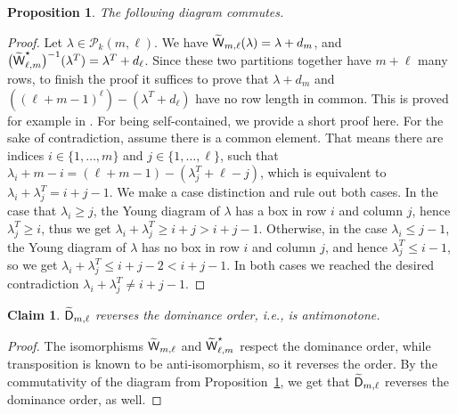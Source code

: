 \documentclass[a4paper]{extarticle}
\newcommand{\la}{\lambda}
\newcommand{\Hodge}{\textsf{\textup{D}}}
\newcommand{\Wronski}{\textsf{\textup{W}}}
\newcommand{\Hermite}{\textsf{\textup{R}}}
\numberwithin{theorem}{section}
\newtheorem{proposition}[theorem]{Proposition}
\newtheorem{claim}[theorem]{Claim}
\theoremstyle{definition}
\begin{document}
\begin{proposition}
\label{pro:transposition}
The following diagram commutes.
\begin{center}
{\centering
{}
}
\end{center}
\end{proposition}


\begin{proof}
Let $\la\in\mathscr P_k(m,\ell)$.
We have $\widetilde{\Wronski}_{m,\ell}(\la) = \la+d_m$,
and $\big(\widetilde{\Wronski}^\star_{\ell,m}\big)^{-1}(\la^T) = \la^T+d_\ell$.
Since these two partitions together have $m+\ell$ many rows,
to finish the proof
it suffices to prove that
$\la+d_m$ and $((\ell+m-1)^\ell)-(\la^T+d_\ell)$ have no row length in common.
This is proved for example in \cite[eq.~(1.7)]{MacD98}.
For being self-contained, we provide a short proof here.
For the sake of contradiction, assume there is a common element.
That means there are indices $i\in \{1,\dots, m\}$ and $j\in \{1,\dots, \ell\}$, such that $\la_i + m-i = (\ell+m -1)- (\la^T_j + \ell - j)$, which is equivalent to $\la_i+\la^T_j=i+j-1$.
We make a case distinction and rule out both cases.
In the case that $\la_i\geq j$,
the Young diagram of $\la$ has a box in row $i$ and column $j$, hence $\la^T_j\geq i$, thus we get $\la_i+\la^T_j\geq i+j>i+j-1$.
Otherwise, in the case $\la_i \leq j-1$, the Young diagram of $\la$ has no box in row $i$ and column $j$,
and hence $\la^T_j\leq i-1$, so we get $\la_i+\la^T_j\leq i+j-2 < i+j-1$.
In both cases we reached the desired contradiction $\la_i+\la^T_j\neq i+j-1$.
\end{proof}


\begin{claim}\label{cla:Hodgereverse}
$\widetilde{\Hodge}_{m,\ell}$ reverses the dominance order, i.e., is antimonotone.
\end{claim}
\begin{proof}
The isomorphisms $\widetilde{\Wronski}_{m,\ell}$ and $\widetilde{\Wronski}^\star_{\ell,m}$ respect the dominance order, while transposition is known to be anti-isomorphism, so it reverses the order.
By the commutativity of the diagram from Proposition~\ref{pro:transposition}, we get that $\widetilde{\Hodge}_{m,\ell}$ reverses the dominance order, as well.
\end{proof}
\end{document}
